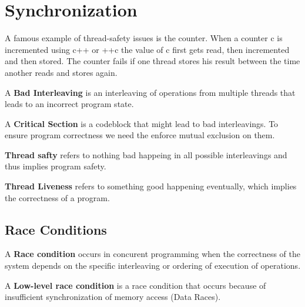 \section{Synchronization}

\begin{example}
    A famous example of thread-safety issues is the counter. When a counter c is incremented using c++ or ++c the value of c
    first gets read, then incremented and then stored. The counter fails if one thread stores his result between
    the time another reads and stores again.
\end{example}

\begin{definition}
    A \textbf{Bad Interleaving} is an interleaving of operations from multiple threads that leads to an incorrect
    program state.
\end{definition}

\begin{definition}
    A \textbf{Critical Section} is a codeblock that might lead to bad interleavings. To ensure program correctness we need the enforce mutual exclusion on them.
\end{definition}

\begin{definition}
    \textbf{Thread safty} refers to nothing bad happeing in all possible interleavings and thus implies program safety.
\end{definition}

\begin{definition}
    \textbf{Thread Liveness} refers to something good happening eventually, which implies the correctness of a program.
\end{definition}

\subsection{Race Conditions}

\begin{definition}
    A \textbf{Race condition} occurs in concurent programming when the correctness of the system depends on
    the specific interleaving or ordering of execution of operations.
\end{definition}

\begin{definition}
    A \textbf{Low-level race condition} is a race condition that occurs because of insufficient
    synchronization of memory access (Data Races).
\end{definition}

